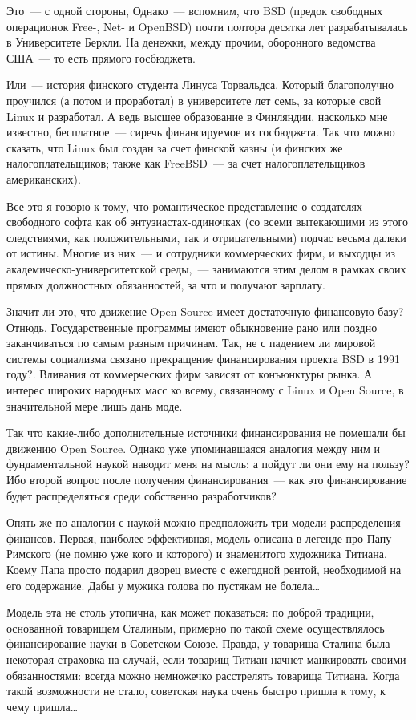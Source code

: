 Это~--- с одной стороны, Однако~--- вспомним, что BSD (предок свободных операционок Free-, Net- и OpenBSD) почти полтора десятка лет разрабатывалась в Университете Беркли. На денежки, между прочим, оборонного ведомства США~--- то есть прямого госбюджета.

Или~--- история финского студента Линуса Торвальдса. Который благополучно проучился (а потом и проработал) в университете лет семь, за которые свой Linux и разработал. А ведь высшее образование в Финляндии, насколько мне известно, бесплатное~--- сиречь финансируемое из госбюджета. Так что можно сказать, что Linux был создан за счет финской казны (и финских же налогоплательщиков; также как FreeBSD~--- за счет налогоплательщиков американских).

Все это я говорю к тому, что романтическое представление о создателях свободного софта как об энтузиастах-одиночках (со всеми вытекающими из этого следствиями, как положительными, так и отрицательными) подчас весьма далеки от истины. Многие из них~--- и сотрудники коммерческих фирм, и выходцы из академическо-университетской среды,~--- занимаются этим делом в рамках своих прямых должностных обязанностей, за что и получают зарплату.

Значит ли это, что движение Open Source имеет достаточную финансовую базу? Отнюдь. Государственные программы имеют обыкновение рано или поздно заканчиваться по самым разным причинам. Так, не с падением ли мировой системы социализма связано прекращение финансирования проекта BSD в 1991 году?. Вливания от коммерческих фирм зависят от конъюнктуры рынка. А интерес широких народных масс ко всему, связанному с Linux и Open Source, в значительной мере лишь дань моде.

Так что какие-либо дополнительные источники финансирования не помешали бы движению Open Source. Однако уже упоминавшаяся аналогия между ним и фундаментальной наукой наводит меня на мысль: а пойдут ли они ему на пользу? Ибо второй вопрос после получения финансирования~--- как это финансирование будет распределяться среди собственно разработчиков?

Опять же по аналогии с наукой можно предположить три модели распределения финансов. Первая, наиболее эффективная, модель описана в легенде про Папу Римского (не помню уже кого и которого) и знаменитого художника Титиана. Коему Папа просто подарил дворец вместе с ежегодной рентой, необходимой на его содержание. Дабы у мужика голова по пустякам не болела\dots

Модель эта не столь утопична, как может показаться: по доброй традиции, основанной товарищем Сталиным, примерно по такой схеме осуществлялось финансирование науки в Советском Союзе. Правда, у товарища Сталина была некоторая страховка на случай, если товарищ Титиан начнет манкировать своими обязанностями: всегда можно немножечко расстрелять товарища Титиана. Когда такой возможности не стало, советская наука очень быстро пришла к тому, к чему пришла\dots

